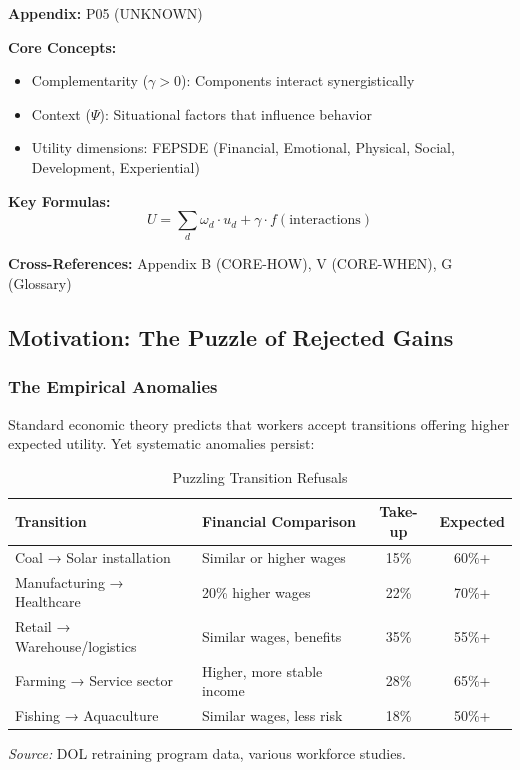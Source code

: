 \begin{tcolorbox}[colback=blue!5!white, colframe=blue!75!black,
    title=Quick Reference: Unknown]

\textbf{Appendix:} P05 (UNKNOWN)

\textbf{Core Concepts:}
\begin{itemize}[nosep]
\item Complementarity ($\gamma > 0$): Components interact synergistically
\item Context ($\Psi$): Situational factors that influence behavior
\item Utility dimensions: FEPSDE (Financial, Emotional, Physical, Social, Development, Experiential)
\end{itemize}

\textbf{Key Formulas:}
\begin{equation}
U = \sum_d \omega_d \cdot u_d + \gamma \cdot f(\text{interactions})
\end{equation}

\textbf{Cross-References:} Appendix B (CORE-HOW), V (CORE-WHEN), G (Glossary)
\end{tcolorbox}

\subsection{Motivation: The Puzzle of Rejected Gains}

\subsubsection{The Empirical Anomalies}

Standard economic theory predicts that workers accept transitions offering 
higher expected utility. Yet systematic anomalies persist:

\begin{table}[htbp]
\centering
\caption{Puzzling Transition Refusals}
\label{tab:refusal-puzzles}
\small
\begin{tabular}{@{}p{4cm}p{4cm}cc@{}}
\toprule
\textbf{Transition} & \textbf{Financial Comparison} & \textbf{Take-up} & \textbf{Expected} \\
\midrule
Coal → Solar installation & Similar or higher wages & 15\% & 60\%+ \\
Manufacturing → Healthcare & 20\% higher wages & 22\% & 70\%+ \\
Retail → Warehouse/logistics & Similar wages, benefits & 35\% & 55\%+ \\
Farming → Service sector & Higher, more stable income & 28\% & 65\%+ \\
Fishing → Aquaculture & Similar wages, less risk & 18\% & 50\%+ \\
\bottomrule
\end{tabular}
\begin{flushleft}
\small\textit{Source:} DOL retraining program data, various workforce studies.
\end{flushleft}
\end{table}


